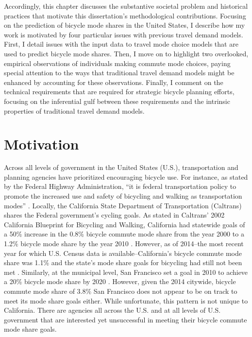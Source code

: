 Accordingly, this chapter discusses the substantive societal problem and historical practices that motivate this dissertation's methodological contributions. Focusing on the prediction of bicycle mode shares in the United States, I describe how my work is motivated by four particular issues with previous travel demand models. First, I detail issues with the input data to travel mode choice models that are used to predict bicycle mode shares. Then, I move on to highlight two overlooked, empirical observations of individuals making commute mode choices, paying special attention to the ways that traditional travel demand models might be enhanced by accounting for these observations. Finally, I comment on the technical requirements that are required for strategic bicycle planning efforts, focusing on the inferential gulf between these requirements and the intrinsic properties of traditional travel demand models.

\section{Motivation}
\label{sec:intro-motivation}
Across all levels of government in the United States (U.S.), transportation and planning agencies have prioritized encouraging bicycle use. For instance, as stated by the Federal Highway Administration, ``it is federal transportation policy to promote the increased use and safety of bicycling and walking as transportation modes'' \citep{federal_highway_administration_bicycle_2003}. Locally, the California State Department of Transportation (Caltrans) shares the Federal government’s cycling goals. As stated in Caltrans' 2002 California Blueprint for Bicycling and Walking, California had statewide goals of a 50\% increase in the 0.8\% bicycle commute mode share from the year 2000 to a 1.2\% bicycle mode share by the year 2010 \citep{california_department_of_transportation_california_2002}. However, as of 2014--the most recent year for which U.S. Census data is available--California's bicycle commute mode share was 1.1\% and the state's mode share goals for bicycling had still not been met \citep{u.s._census_bureau_b08006:_2014}. Similarly, at the municipal level, San Francisco set a goal in 2010 to achieve a 20\% bicycle mode share by 2020 \citep{sfmta_2012_2012}. However, given the 2014 citywide, bicycle commute mode share of 3.8\% \citep{u.s._census_bureau_b08006:_2014} San Francisco does not appear to be on track to meet its mode share goals either. While unfortunate, this pattern is not unique to California. There are agencies all across the U.S. and at all levels of U.S. government that are interested yet unsuccessful in meeting their bicycle commute mode share goals.

